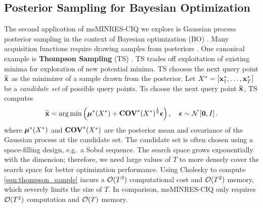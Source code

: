 \subsection{Posterior Sampling for Bayesian Optimization}
\label{sec:bayesopt_results}
The second application of msMINRES-CIQ we explore is Gaussian process posterior sampling in the context of Bayesian optimization (BO) \citep[e.g.][]{snoek2012practical}.
Many acquisition functions require drawing samples from posteriors \citep[e.g.][]{frazier2009knowledge,hernandez2014predictive,wang2017max}.
One canonical example is {\bf Thompson Sampling} (TS) \cite{thompson1933likelihood, hernandez2017parallel, kandasamy2018parallelised}.
TS trades off exploitation of existing minima for exploration of new potential minima.
TS chooses the next query point $\widetilde {\mathbf{x}} $ as the minimizer of a sample drawn from the posterior.
Let $X^* = [ \mathbf{x}^*_1, \ldots, \mathbf{x}^*_T ]$ be a \emph{candidate set} of possible query points.
To choose the next query point $\widetilde {\mathbf{x}}$, TS computes
%
\begin{equation}
  \widetilde \bx = \argmin \left( \bmeantest(\bXtest) + {\Covtest(\bXtest)}^{\frac 1 2} \bepsilon \right),
  \quad
  \bepsilon \sim \normaldist{\bzero}{\bI}.
  \label{eqn:thompson_sample}
\end{equation}
%
where $\boldsymbol{\mu}^*(X^*)$ and $\textbf{COV}^*(X^*)$ are the posterior mean and covariance of the Gaussian process at the candidate set.
The candidate set is often chosen using a space-filling design, e.g.~a Sobol sequence.
The search space grows exponentially with the dimension; therefore, we need large values of $T$ to more densely cover the search space for better optimization performance.
Using Cholesky to compute \cref{eqn:thompson_sample} incurs a $\bigo{T^3}$ computational cost and $\bigo{T^2}$ memory, which severely limits the size of $T$.
In comparison, msMINRES-CIQ only requires $\bigo{T^2}$ computation and $\bigo{T}$ memory.

